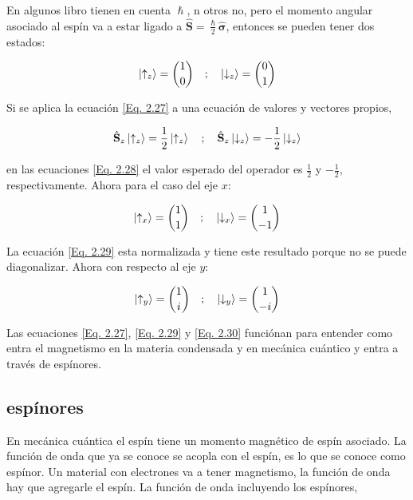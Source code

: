 \documentclass[11pt,fleqn]{book}
\renewcommand{\vec}[1]{\mathbf{#1}}
\begin{document}
En algunos libro tienen en cuenta $\hslash$, n otros no, pero el momento angular asociado al espín va a estar ligado a $\hat{\vec{S}}=\frac{\hslash}{2}\hat{\vec{\sigma}}$, entonces se pueden tener dos estados:

\begin{equation}
    \ket{\uparrow_{z}}=\binom{1}{0}\quad;\quad\ket{\downarrow_{z}}=\binom{0}{1}
    \label{Eq. 2.27}
\end{equation}

Si se aplica la ecuación \ref{Eq. 2.27} a una ecuación de valores y vectores propios,

\begin{equation}
    \hat{\vec{S}}_{z}\ket{\uparrow_{z}}=\frac{1}{2}\ket{\uparrow_{z}}\quad;\quad\hat{\vec{S}}_{z}\ket{\downarrow_{z}}=-\frac{1}{2}\ket{\downarrow_{z}}
    \label{Eq. 2.28}
\end{equation}

en las ecuaciones \ref{Eq. 2.28} el valor esperado del operador es $\frac{1}{2}$ y $-\frac{1}{2}$, respectivamente. Ahora para el caso del eje $x$:

\begin{equation}
    \ket{\uparrow_{x}}=\binom{1}{1}\quad;\quad\ket{\downarrow_{x}}=\binom{1}{-1}
    \label{Eq. 2.29}
\end{equation}

La ecuación \ref{Eq. 2.29} esta normalizada y tiene este resultado porque no se puede diagonalizar. Ahora con respecto al eje $y$:

\begin{equation}
    \ket{\uparrow_{y}}=\binom{1}{i}\quad;\quad\ket{\downarrow_{y}}=\binom{1}{-i}
    \label{Eq. 2.30}
\end{equation}

Las ecuaciones \ref{Eq. 2.27}, \ref{Eq. 2.29} y \ref{Eq. 2.30} funciónan para entender como entra el magnetismo en la materia condensada y en mecánica cuántico y entra a través de espínores.

\subsection{espínores}

En mecánica cuántica el espín tiene un momento magnético de espín asociado. La función de onda que ya se conoce se acopla con el espín, es lo que se conoce como espínor. Un material con electrones va a tener magnetismo, la función de onda hay que agregarle el espín. La función de onda incluyendo los espínores,
\end{document}
